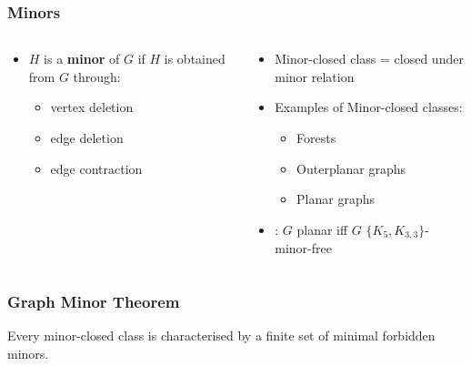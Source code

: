 \documentclass[english]{beamer}
\begin{document}
\begin{frame}
  \frametitle{Minors}
  \begin{columns}
    \begin{column}{0.5\textwidth}
      \begin{itemize}
        \item $H$ is a \textbf{minor} of $G$ if $H$ is obtained from $G$ through:
              \begin{itemize}
                \item vertex deletion
                \item edge deletion
                \item edge contraction
              \end{itemize}
              \begin{figure}
                \centering
                
              \end{figure}
      \end{itemize}
    \end{column}
    \pause
    \begin{column}{0.5\textwidth}
      \begin{itemize}
        \item Minor-closed class = closed under minor relation
        \item Examples of Minor-closed classes:
              \begin{itemize}
                \item Forests
                \item Outerplanar graphs
                \item Planar graphs
              \end{itemize}
        \item \cite{kuratowskiProblemeCourbesGauches1930,wagnerUeberEigenschaftEbenen1937}: $G$ planar iff $G$ $\{K_5, K_{3,3}\}$-minor-free
      \end{itemize}
    \end{column}
  \end{columns}
\end{frame}

\begin{frame}
  \frametitle{Graph Minor Theorem}
    \begin{theorem}
      Every minor-closed class is characterised by a finite set of minimal forbidden minors.
    \end{theorem}
  \end{frame}
\end{document}
